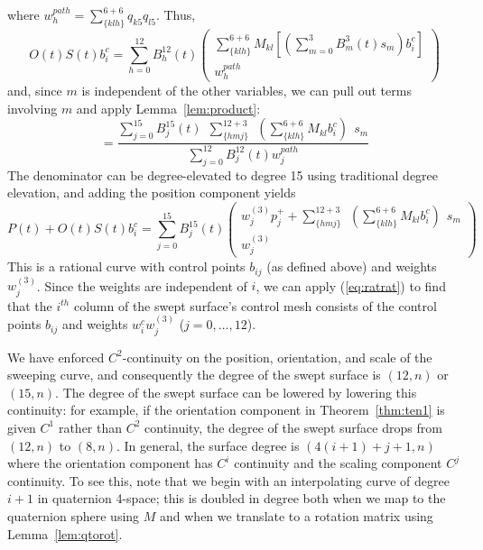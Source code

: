 \documentclass[times]{article}
\newcommand{\QED}{\vrule height 1.4ex width 1.0ex depth -.1ex\ } %
\begin{document}
where $w_h^{path} = \sum_{\{klh\}}^{6+6} q_{k5} q_{l5}$.
Thus,
\[
O(t)S(t)b_i^c = 
	\sum_{h=0}^{12} B_h^{12}(t) 
	\left(	\begin{array}{c}
	\sum_{\{klh\}}^{6+6} M_{kl} [(\sum_{m=0}^3 B_m^3(t) s_m) b_i^c] \\
	w_h^{path}
	\end{array} \right)
\]
and, since $m$ is independent of the other variables, 
we can pull out terms involving $m$ and apply Lemma~\ref{lem:product}:
\[
= \frac{\sum_{j=0}^{15} B_j^{15}(t) \ \ \sum_{\{hmj\}}^{12+3} \ \ 
		(\sum_{\{klh\}}^{6+6} M_{kl} b_i^c) \ \ s_m}
     {\sum_{j=0}^{12} B_j^{12}(t) w_j^{path}}
\]
The denominator can be degree-elevated to degree 15 using 
traditional degree elevation,
and adding the position component yields
\[
P(t) + O(t)S(t)b_i^c = 
\sum_{j=0}^{15} B_j^{15}(t) 
	\left(	\begin{array}{c}
	w^{(3)}_j p_j^{+} + 
	\sum_{\{hmj\}}^{12+3} \ \ 
		(\sum_{\{klh\}}^{6+6} M_{kl} b_i^c) \ \ s_m
	\\ w^{(3)}_j
	\end{array} \right)
\]
This is a rational curve with control points $b_{ij}$
(as defined above) and weights $w^{(3)}_j$.
Since the weights are independent of $i$, we can apply (\ref{eq:ratrat})
to find that the $i^{th}$ column of the swept surface's control mesh
consists of the control points $b_{ij}$ and weights 
$w_i^c  w^{(3)}_j$ ($j=0,\ldots,12$).
\QED

We have enforced $C^2$-continuity on the position, orientation,
and scale of the sweeping curve, and consequently the degree of the
swept surface is $(12,n)$ or $(15,n)$.
The degree of the swept surface can be lowered by lowering this continuity:
for example, if the orientation component
in Theorem~\ref{thm:ten1} is given $C^1$ rather than $C^2$ continuity, 
the degree of the swept surface drops from $(12,n)$ to $(8,n)$.
In general, the surface degree is $(4(i+1)+j+1,n)$ where the orientation
component has $C^i$ continuity and the scaling component $C^j$ continuity.
To see this, note that we begin with an interpolating curve of degree $i+1$
in quaternion 4-space; this is doubled in degree both when we map to the 
quaternion sphere using $M$ and when we translate to a rotation matrix
using Lemma~\ref{lem:qtorot}.
\end{document}
